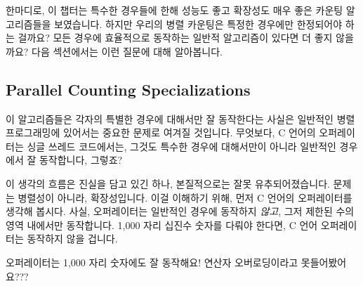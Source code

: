 한마디로, 이 챕터는 특수한 경우들에 한해 성능도 좋고 확장성도 매우 좋은 카운팅
알고리즘들을 보였습니다.
하지만 우리의 병렬 카운팅은 특정한 경우에만 한정되어야 하는 걸까요?
모든 경우에 효율적으로 동작하는 일반적 알고리즘이 있다면 더 좋지 않을까요?
다음 섹션에서는 이런 질문에 대해 알아봅니다.

\subsection{Parallel Counting Specializations}
\label{sec:count:Parallel Counting Specializations}

이 알고리즘들은 각자의 특별한 경우에 대해서만 잘 동작한다는 사실은 일반적인
병렬 프로그래밍에 있어서는 중요한 문제로 여겨질 것입니다.
무엇보다, C 언어의 \co{++} 오퍼레이터는 싱글 쓰레드 코드에서는, 그것도 특수한
경우에 대해서만이 아니라 일반적인 경우에서 잘 동작합니다, 그렇죠?

이 생각의 흐름은 진실을 담고 있긴 하나, 본질적으로는 잘못 유추되어졌습니다.
문제는 병렬성이 아니라, 확장성입니다.
이걸 이해하기 위해, 먼저 C 언어의 \co{++} 오퍼레이터를 생각해 봅시다.
사실, \co{++} 오퍼레이터는 일반적인 경우에 동작하지 \emph{않고}, 그저 제한된
수의 영역 내에서만 동작합니다.
1,000 자리 십진수 숫자를 다뤄야 한다면, C 언어 \co{++} 오퍼레이터는 동작하지
않을 겁니다.

\QuickQuiz{}
	\co{++} 오퍼레이터는 1,000 자리 숫자에도 잘 동작해요!
	연산자 오버로딩이라고 못들어봤어요???
	\iffalse

